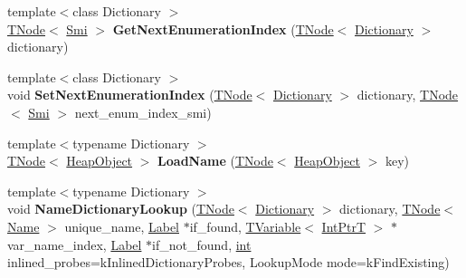 \begin{DoxyCompactItemize}
\item 
\mbox{\label{classv8_1_1internal_1_1CodeStubAssembler_a848912962713a6aef4cd5e762baa43c5}} 
{\footnotesize template$<$class Dictionary $>$ }\\\mbox{\hyperlink{classv8_1_1internal_1_1compiler_1_1TNode}{T\+Node}}$<$ \mbox{\hyperlink{classv8_1_1internal_1_1Smi}{Smi}} $>$ {\bfseries Get\+Next\+Enumeration\+Index} (\mbox{\hyperlink{classv8_1_1internal_1_1compiler_1_1TNode}{T\+Node}}$<$ \mbox{\hyperlink{classv8_1_1internal_1_1Dictionary}{Dictionary}} $>$ dictionary)
\item 
\mbox{\label{classv8_1_1internal_1_1CodeStubAssembler_a486c12c0ef769d4bda2b7f5a338b35cd}} 
{\footnotesize template$<$class Dictionary $>$ }\\void {\bfseries Set\+Next\+Enumeration\+Index} (\mbox{\hyperlink{classv8_1_1internal_1_1compiler_1_1TNode}{T\+Node}}$<$ \mbox{\hyperlink{classv8_1_1internal_1_1Dictionary}{Dictionary}} $>$ dictionary, \mbox{\hyperlink{classv8_1_1internal_1_1compiler_1_1TNode}{T\+Node}}$<$ \mbox{\hyperlink{classv8_1_1internal_1_1Smi}{Smi}} $>$ next\+\_\+enum\+\_\+index\+\_\+smi)
\item 
\mbox{\label{classv8_1_1internal_1_1CodeStubAssembler_a46b623359dadce46a3bee70d4c8633df}} 
{\footnotesize template$<$typename Dictionary $>$ }\\\mbox{\hyperlink{classv8_1_1internal_1_1compiler_1_1TNode}{T\+Node}}$<$ \mbox{\hyperlink{classv8_1_1internal_1_1HeapObject}{Heap\+Object}} $>$ {\bfseries Load\+Name} (\mbox{\hyperlink{classv8_1_1internal_1_1compiler_1_1TNode}{T\+Node}}$<$ \mbox{\hyperlink{classv8_1_1internal_1_1HeapObject}{Heap\+Object}} $>$ key)
\item 
\mbox{\label{classv8_1_1internal_1_1CodeStubAssembler_aa421b3fa25c24cbb819508d25f391978}} 
{\footnotesize template$<$typename Dictionary $>$ }\\void {\bfseries Name\+Dictionary\+Lookup} (\mbox{\hyperlink{classv8_1_1internal_1_1compiler_1_1TNode}{T\+Node}}$<$ \mbox{\hyperlink{classv8_1_1internal_1_1Dictionary}{Dictionary}} $>$ dictionary, \mbox{\hyperlink{classv8_1_1internal_1_1compiler_1_1TNode}{T\+Node}}$<$ \mbox{\hyperlink{classv8_1_1internal_1_1Name}{Name}} $>$ unique\+\_\+name, \mbox{\hyperlink{classv8_1_1internal_1_1compiler_1_1CodeAssemblerLabel}{Label}} $\ast$if\+\_\+found, \mbox{\hyperlink{classv8_1_1internal_1_1compiler_1_1TypedCodeAssemblerVariable}{T\+Variable}}$<$ \mbox{\hyperlink{structv8_1_1internal_1_1IntPtrT}{Int\+PtrT}} $>$ $\ast$var\+\_\+name\+\_\+index, \mbox{\hyperlink{classv8_1_1internal_1_1compiler_1_1CodeAssemblerLabel}{Label}} $\ast$if\+\_\+not\+\_\+found, \mbox{\hyperlink{classint}{int}} inlined\+\_\+probes=k\+Inlined\+Dictionary\+Probes, Lookup\+Mode mode=k\+Find\+Existing)

\end{DoxyCompactItemize}
